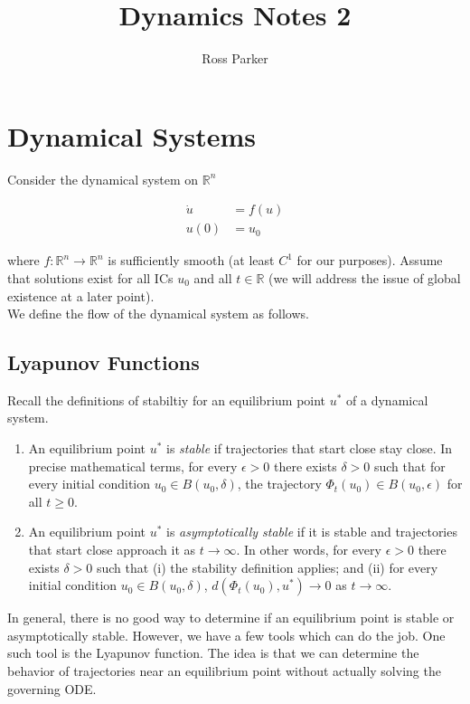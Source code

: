 \documentclass{article}
\title{Dynamics Notes 2}
\author{Ross Parker}
\def\R{{\mathbb R}}
\begin{document}
\section{Dynamical Systems}

Consider the dynamical system on $\R^n$

\begin{align*}
\dot{u} &= f(u) \\
u(0) &= u_0
\end{align*}

where $f: \R^n \rightarrow \R^n$ is sufficiently smooth (at least $C^1$ for our purposes). Assume that solutions exist for all ICs $u_0$ and all $t \in \R$ (we will address the issue of global existence at a later point).\\

We define the flow of the dynamical system as follows.

\pagebreak

\subsection{Lyapunov Functions}

Recall the definitions of stabiltiy for an equilibrium point $u^*$ of a dynamical system.

\begin{enumerate}
\item An equilibrium point $u^*$ is \emph{stable} if trajectories that start close stay close. In precise mathematical terms, for every $\epsilon > 0$ there exists $\delta > 0$ such that for every initial condition $u_0 \in B(u_0, \delta)$, the trajectory $\Phi_t(u_0) \in B(u_0, \epsilon)$ for all $t \geq 0$. 
\item An equilibrium point $u^*$ is \emph{asymptotically stable} if it is stable and trajectories that start close approach it as $t \rightarrow \infty$. In other words, for every $\epsilon > 0$ there exists $\delta > 0$ such that (i) the stability definition applies; and (ii) for every initial condition $u_0 \in B(u_0, \delta)$, $d(\Phi_t(u_0), u^*) \rightarrow 0$ as $t \rightarrow \infty$.
\end{enumerate}

In general, there is no good way to determine if an equilibrium point is stable or asymptotically stable. However, we have a few tools which can do the job. One such tool is the Lyapunov function. The idea is that we can determine the behavior of trajectories near an equilibrium point without actually solving the governing ODE.\\
\end{document}
